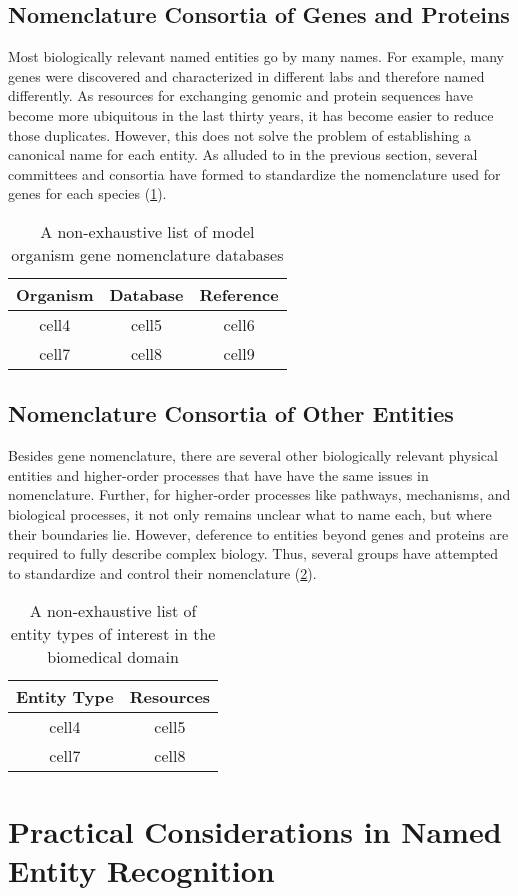 \subsection{Nomenclature Consortia of Genes and Proteins}

Most biologically relevant named entities go by many names.
For example, many genes were discovered and characterized in different labs and therefore named differently.
As resources for exchanging genomic and protein sequences have become more ubiquitous in the last thirty years, it has become easier to reduce those duplicates.
However, this does not solve the problem of establishing a canonical name for each entity.
As alluded to in the previous section, several committees and consortia have formed to standardize the nomenclature used for genes for each species (\ref{table:gene_nomenclature_databases}).

\begin{table}
    \centering
    \begin{tabular}{ c c c }
        Organism & Database & Reference \\
        \hline
        cell4 & cell5 & cell6 \\
        cell7 & cell8 & cell9
    \end{tabular}
    \caption{A non-exhaustive list of model organism gene nomenclature databases}
    \label{table:gene_nomenclature_databases}
\end{table}

\subsection{Nomenclature Consortia of Other Entities}

Besides gene nomenclature, there are several other biologically relevant physical entities and higher-order processes that have have the same issues in nomenclature.
Further, for higher-order processes like pathways, mechanisms, and biological processes, it not only remains unclear what to name each, but where their boundaries lie.
However, deference to entities beyond genes and proteins are required to fully describe complex biology.
Thus, several groups have attempted to standardize and control their nomenclature (\ref{table:other_nomenclature_databases}).

\begin{table}
    \centering
    \begin{tabular}{ c c }
        Entity Type & Resources \\
        \hline
        cell4 & cell5 \\
        cell7 & cell8
    \end{tabular}
    \caption{A non-exhaustive list of entity types of interest in the biomedical domain}
    \label{table:other_nomenclature_databases}
\end{table}

\section{Practical Considerations in Named Entity Recognition}
